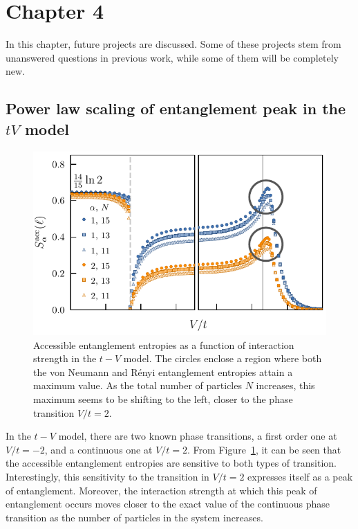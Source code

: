 \section{Chapter 4}

	In this chapter, future projects are discussed. Some of these projects stem from unanswered questions in previous work, while some of them will be completely new.
	
	\subsection{Power law scaling of entanglement peak in the $tV$ model}
	
	\begin{figure}[htp]
	\begin{center}
	\includegraphics[width=1.0\columnwidth]{operationalEntanglementEntropies_SOP5_withPeakCircles.pdf}
	\end{center}
	\caption{Accessible entanglement entropies as a function of interaction strength in the $t-V$ model. The circles enclose a region where both the von Neumann and R\'enyi entanglement entropies attain a maximum value. As the total number of particles $N$ increases, this maximum seems to be shifting to the left, closer to the phase transition $V/t=2$.}
	\label{fig:OEE_circledPeaks}
	\end{figure}
	
	In the $t-V$ model, there are two known phase transitions, a first order one at $V/t=-2$, and a continuous one at $V/t=2$. From Figure~{\ref{fig:OEE_circledPeaks}}, it can be seen that the accessible entanglement entropies are sensitive to both types of transition. Interestingly, this sensitivity to the transition in $V/t=2$ expresses itself as a peak of entanglement. Moreover, the interaction strength at which this peak of entanglement occurs moves closer to the exact value of the continuous phase transition as the number of particles in the system increases.  

